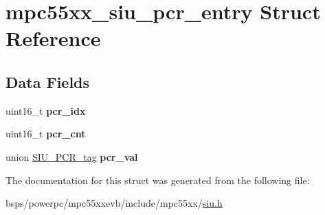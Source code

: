 \hypertarget{structmpc55xx__siu__pcr__entry}{}\section{mpc55xx\+\_\+siu\+\_\+pcr\+\_\+entry Struct Reference}
\label{structmpc55xx__siu__pcr__entry}
\subsection*{Data Fields}
\begin{DoxyCompactItemize}
\item 
\mbox{\label{structmpc55xx__siu__pcr__entry_aa2b908720052b058cfe2a891779d1002}} 
uint16\+\_\+t {\bfseries pcr\+\_\+idx}
\item 
\mbox{\label{structmpc55xx__siu__pcr__entry_a4e6e824eef2425e4509c8a79178900e7}} 
uint16\+\_\+t {\bfseries pcr\+\_\+cnt}
\item 
\mbox{\label{structmpc55xx__siu__pcr__entry_a3aa111ea50bdcfc10435b3820021c3fa}} 
union \mbox{\hyperlink{unionSIU__PCR__tag}{S\+I\+U\+\_\+\+P\+C\+R\+\_\+tag}} {\bfseries pcr\+\_\+val}
\end{DoxyCompactItemize}


The documentation for this struct was generated from the following file\+:\begin{DoxyCompactItemize}
\item 
bsps/powerpc/mpc55xxevb/include/mpc55xx/\mbox{\hyperlink{siu_8h}{siu.\+h}}\end{DoxyCompactItemize}
